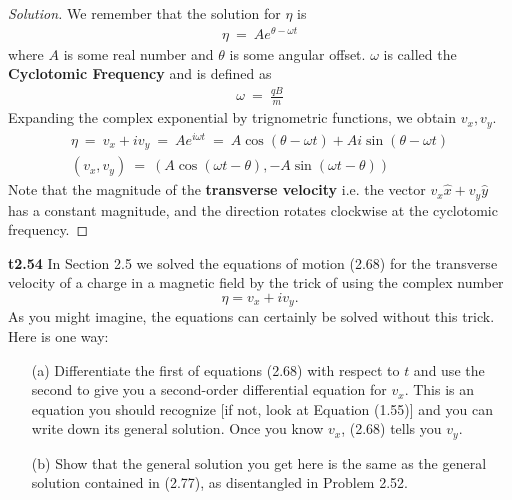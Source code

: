 \documentclass{article}
\numberwithin{equation}{section}
\begin{document}
\begin{proof}[Solution]
    We remember that the solution for $\eta$ is 
    \begin{eqnarray}
        \eta \ = \ A e^{\theta - \omega t}
    \end{eqnarray}    
    where $A$ is some real number and $\theta$ is some angular offset. 
    $\omega$ is called the \textbf{Cyclotomic Frequency} and is defined as 
    \begin{eqnarray}
        \omega \ = \ \frac{qB} m
    \end{eqnarray}
    Expanding the complex exponential by trignometric functions, we 
    obtain $v_x, v_y$. 
    \begin{eqnarray}
        \eta \ = \ v_x + iv_y \ = \ A e^{i \omega t} \ = \ A \cos (\theta - \omega t) + A
        i\sin(\theta -\omega t)\nonumber\\ 
        (v_x, v_y) \ = \ (A\cos(\omega t - \theta), -A\sin(\omega t - \theta))
    \end{eqnarray}
    Note that the magnitude of the \textbf{transverse velocity} i.e. the vector 
    $v_x\hat x + v_y \hat y$ has a constant magnitude, and the direction rotates 
    clockwise at the cyclotomic frequency. 
\end{proof}

 \textbf{t2.54}
In Section 2.5 we solved the equations of motion (2.68) for the transverse velocity of a charge in a magnetic field by the trick of using the complex number 
\[
\eta = v_x + i v_y.
\]
As you might imagine, the equations can certainly be solved without this trick. Here is one way:

\begin{itemize}
    \item[(a)] Differentiate the first of equations (2.68) with respect to \( t \) and use the second to give you a second-order differential equation for \( v_x \). This is an equation you should recognize [if not, look at Equation (1.55)] and you can write down its general solution. Once you know \( v_x \), (2.68) tells you \( v_y \).
    
    \item[(b)] Show that the general solution you get here is the same as the general solution contained in (2.77), as disentangled in Problem 2.52.
\end{itemize}
\end{document}
